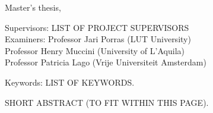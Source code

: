 Master’s thesis, 
\the\year{}\\

\begin{flushleft}
    Supervisors: LIST OF PROJECT SUPERVISORS \\
    Examiners: Professor Jari Porras (LUT University)\\ 
    \hspace{21mm}Professor Henry Muccini (University of L’Aquila)\\ \hspace{21mm}Professor Patricia Lago (Vrije Universiteit Amsterdam)
\end{flushleft}

Keywords: LIST OF KEYWORDS.
\hspace{1em}


SHORT ABSTRACT (TO FIT WITHIN THIS PAGE).

